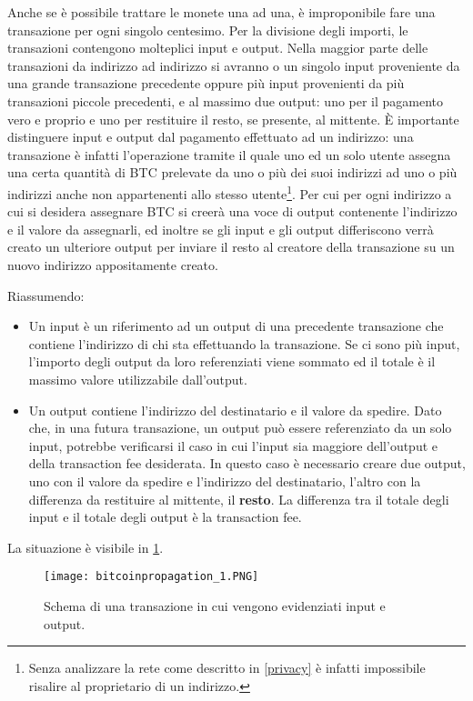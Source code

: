 Anche se è possibile trattare le monete una ad una, è improponibile fare una transazione per ogni singolo centesimo. Per la divisione degli importi, le transazioni contengono molteplici input e output. Nella maggior parte delle transazioni da indirizzo ad indirizzo si avranno o un singolo input proveniente da una grande transazione precedente oppure più input provenienti da più transazioni piccole precedenti, e al massimo due output: uno per il pagamento vero e proprio e uno per restituire il resto, se presente, al mittente. È importante distinguere input e output dal pagamento effettuato ad un indirizzo: una transazione è infatti l'operazione tramite il quale uno ed un solo utente assegna una certa quantità di BTC prelevate da uno o più dei suoi indirizzi ad uno o più indirizzi anche non appartenenti allo stesso utente\footnote{Senza analizzare la rete come descritto in \ref{privacy} è infatti impossibile risalire al proprietario di un indirizzo.}. Per cui per ogni indirizzo a cui si desidera assegnare BTC si creerà una voce di output contenente l'indirizzo e il valore da assegnarli, ed inoltre se gli input e gli output differiscono verrà creato un ulteriore output per inviare il resto al creatore della transazione su un nuovo indirizzo appositamente creato.

Riassumendo:

\begin{itemize}
\itemsep1pt\parskip0pt
\item
  Un input è un riferimento ad un output di una precedente transazione   che contiene l'indirizzo di chi sta effettuando la transazione. Se ci   sono più input, l'importo degli output da loro referenziati viene   sommato ed il totale è il massimo valore utilizzabile dall'output.
\item
  Un output contiene l'indirizzo del destinatario e il valore da   spedire. Dato che, in una futura transazione, un output può essere referenziato da un solo input, potrebbe verificarsi il caso in cui l'input sia maggiore dell'output e della transaction fee desiderata. In questo caso è necessario creare due output, uno con il valore da   spedire e l'indirizzo del destinatario, l'altro con la differenza da   restituire al mittente, il \textbf{resto}. La differenza tra il totale   degli input e il totale degli output è la transaction fee.
\end{itemize}

La situazione è visibile in \ref{bitcoinpropagation_1}.

\begin{figure}[htbp]
\centering
\texttt{[image: bitcoinpropagation\_1.PNG]}
\caption{Schema di una transazione in cui vengono evidenziati input e output.\label{bitcoinpropagation_1}}
\end{figure}

